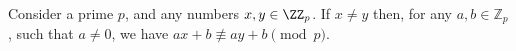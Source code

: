 \begin{lemma}
    Consider a prime $p$, and any numbers $x, y \in \ZZ_p$.  If
    $x \neq y$ then, for any $a, b \in \mathbb{Z}_p$, such that
    $a \neq 0$, we have $a x + b \nequiv a y + b \pmod p$.
\end{lemma}
